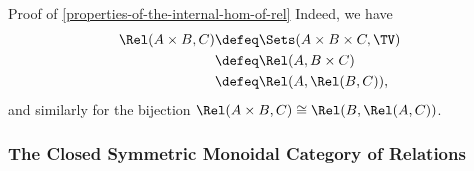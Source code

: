 \begin{Proof}{Proof of \cref{properties-of-the-internal-hom-of-rel}}%
    Indeed, we have
    \begin{align*}
        \Rel(A\times B,C) &\defeq \Sets(A\times B\times C,\TV)\\
                          &\defeq \Rel(A,B\times C)\\
                          &\defeq \Rel(A,\Rel(B,C)),
    \end{align*}
    and similarly for the bijection $\Rel(A\times B,C)\cong\Rel(B,\Rel(A,C))$.
\end{Proof}
\subsubsection{The Closed Symmetric Monoidal Category of Relations}\label{subsubsection-the-closed-symmetric-monoidal-category-of-relations}
